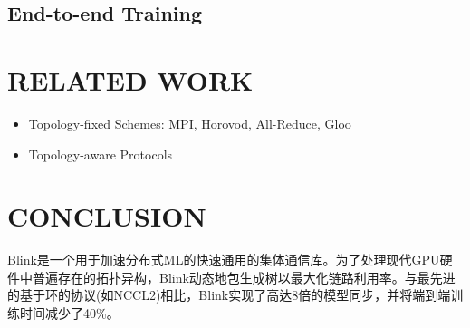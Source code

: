 \documentclass[11pt]{article}
\begin{document}
\subsection{End-to-end Training}
\label{sec:org4c01f65}
\section{RELATED WORK}
\label{sec:org83ab016}
\begin{itemize}
\item Topology-fixed Schemes: MPI, Horovod, All-Reduce, Gloo
\item Topology-aware Protocols
\end{itemize}
\section{CONCLUSION}
\label{sec:org27fa493}
Blink是一个用于加速分布式ML的快速通用的集体通信库。为了处理现代GPU硬件中普遍存在的拓扑异构，Blink动态地包生成树以最大化链路利用率。与最先进的基于环的协议(如NCCL2)相比，Blink实现了高达8倍的模型同步，并将端到端训练时间减少了40\%。
\end{document}
